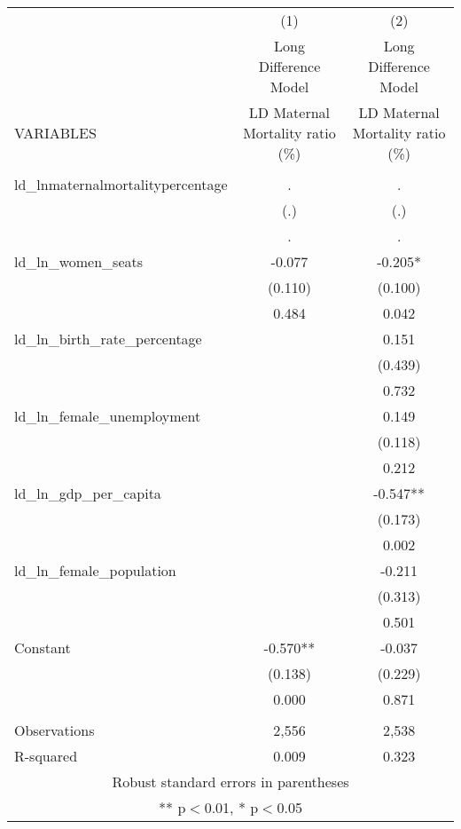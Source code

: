 \begin{tabular}{lcc} \hline
 & (1) & (2) \\
 & Long Difference Model & Long Difference Model \\
VARIABLES & LD Maternal Mortality ratio (\%) & LD Maternal Mortality ratio (\%) \\ \hline
 &  &  \\
ld\_lnmaternalmortalitypercentage & . & . \\
 & (.) & (.) \\
 & . & . \\
ld\_ln\_women\_seats & -0.077 & -0.205* \\
 & (0.110) & (0.100) \\
 & 0.484 & 0.042 \\
ld\_ln\_birth\_rate\_percentage &  & 0.151 \\
 &  & (0.439) \\
 &  & 0.732 \\
ld\_ln\_female\_unemployment &  & 0.149 \\
 &  & (0.118) \\
 &  & 0.212 \\
ld\_ln\_gdp\_per\_capita &  & -0.547** \\
 &  & (0.173) \\
 &  & 0.002 \\
ld\_ln\_female\_population &  & -0.211 \\
 &  & (0.313) \\
 &  & 0.501 \\
Constant & -0.570** & -0.037 \\
 & (0.138) & (0.229) \\
 & 0.000 & 0.871 \\
 &  &  \\
Observations & 2,556 & 2,538 \\
 R-squared & 0.009 & 0.323 \\ \hline
\multicolumn{3}{c}{ Robust standard errors in parentheses} \\
\multicolumn{3}{c}{ ** p$<$0.01, * p$<$0.05} \\
\end{tabular}
